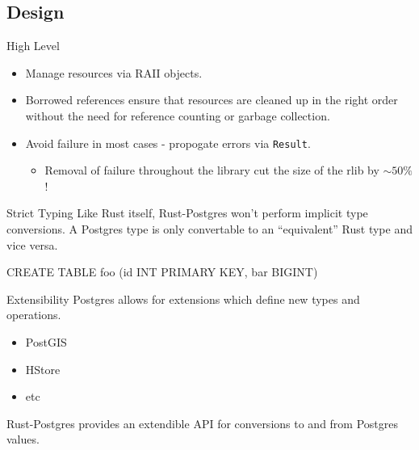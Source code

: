 \documentclass{beamer}
\begin{document}
\subsection{Design}

\begin{frame}[fragile]{High Level}
    \begin{itemize}
        \item Manage resources via RAII objects.
        \item Borrowed references ensure that resources are cleaned up in the right order without the need for reference counting or garbage collection.
        \item Avoid failure in most cases - propogate errors via \verb!Result!.
        \begin{itemize}
            \item Removal of failure throughout the library cut the size of the rlib by $\sim50\%$!
        \end{itemize}
    \end{itemize}
\end{frame}

\begin{frame}[fragile]{Strict Typing}
    Like Rust itself, Rust-Postgres won't perform implicit type conversions. A
    Postgres type is only convertable to an ``equivalent'' Rust type and vice
    versa.
    \begin{sqlcode}
CREATE TABLE foo (id INT PRIMARY KEY, bar BIGINT) 
    \end{sqlcode}
\end{frame}

\begin{frame}{Extensibility}
    Postgres allows for extensions which define new types and operations.
    \begin{itemize}
        \item PostGIS
        \item HStore
        \item etc
    \end{itemize}

    Rust-Postgres provides an extendible API for conversions to and from
    Postgres values.
\end{frame}
\end{document}
